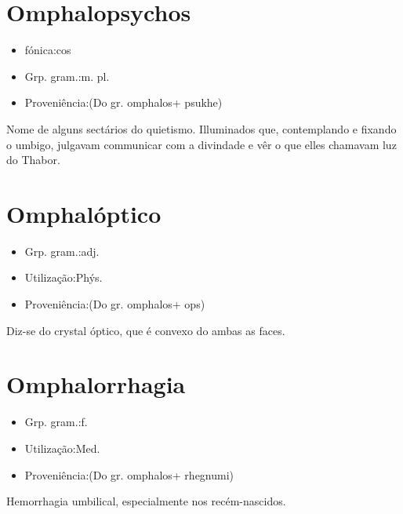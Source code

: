 \section{Omphalopsychos}
\begin{itemize}
\item {fónica:cos}
\end{itemize}
\begin{itemize}
\item {Grp. gram.:m. pl.}
\end{itemize}
\begin{itemize}
\item {Proveniência:(Do gr. \textunderscore omphalos\textunderscore  + \textunderscore psukhe\textunderscore )}
\end{itemize}
Nome de alguns sectários do quietismo.
Illuminados que, contemplando e fixando o umbigo, julgavam communicar com a divindade e vêr o que elles chamavam luz do Thabor.
\section{Omphalóptico}
\begin{itemize}
\item {Grp. gram.:adj.}
\end{itemize}
\begin{itemize}
\item {Utilização:Phýs.}
\end{itemize}
\begin{itemize}
\item {Proveniência:(Do gr. \textunderscore omphalos\textunderscore  + \textunderscore ops\textunderscore )}
\end{itemize}
Diz-se do crystal óptico, que é convexo do ambas as faces.
\section{Omphalorrhagia}
\begin{itemize}
\item {Grp. gram.:f.}
\end{itemize}
\begin{itemize}
\item {Utilização:Med.}
\end{itemize}
\begin{itemize}
\item {Proveniência:(Do gr. \textunderscore omphalos\textunderscore  + \textunderscore rhegnumi\textunderscore )}
\end{itemize}
Hemorrhagia umbilical, especialmente nos recém-nascidos.
